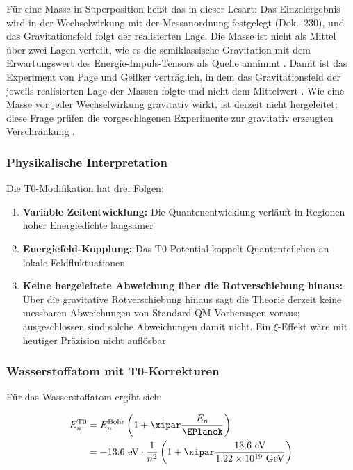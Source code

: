 	Für eine Masse in Superposition heißt das in dieser Lesart: Das Einzelergebnis wird in der Wechselwirkung mit der Messanordnung festgelegt (Dok.~230), und das Gravitationsfeld folgt der realisierten Lage. Die Masse ist nicht als Mittel über zwei Lagen verteilt, wie es die semiklassische Gravitation mit dem Erwartungswert des Energie-Impuls-Tensors als Quelle annimmt \cite{Moller1962,Rosenfeld1963}. Damit ist das Experiment von Page und Geilker verträglich, in dem das Gravitationsfeld der jeweils realisierten Lage der Massen folgte und nicht dem Mittelwert \cite{PageGeilker1981}. Wie eine Masse vor jeder Wechselwirkung gravitativ wirkt, ist derzeit nicht hergeleitet; diese Frage prüfen die vorgeschlagenen Experimente zur gravitativ erzeugten Verschränkung \cite{Bose2017,MarlettoVedral2017}.
	
	\subsubsection{Physikalische Interpretation}
	
	Die T0-Modifikation hat drei Folgen:
	
	\begin{enumerate}
		\item \textbf{Variable Zeitentwicklung:} Die Quantenentwicklung verläuft in Regionen hoher Energiedichte langsamer
		\item \textbf{Energiefeld-Kopplung:} Das T0-Potential koppelt Quantenteilchen an lokale Feldfluktuationen
		\item \textbf{Keine hergeleitete Abweichung über die Rotverschiebung hinaus:} Über die gravitative Rotverschiebung hinaus sagt die Theorie derzeit keine messbaren Abweichungen von Standard-QM-Vorhersagen voraus; ausgeschlossen sind solche Abweichungen damit nicht. Ein $\xi$-Effekt wäre mit heutiger Präzision nicht auflösbar
	\end{enumerate}
	
	\subsubsection{Wasserstoffatom mit T0-Korrekturen}
	
	Für das Wasserstoffatom ergibt sich:
	
	\begin{align}
		E_n^{\text{T0}} &= E_n^{\text{Bohr}} \left(1 + \xipar \frac{E_n}{\EPlanck}\right) \\
		&= -13.6 \text{ eV} \cdot \frac{1}{n^2} \left(1 + \xipar \frac{13.6 \text{ eV}}{1.22 \times 10^{19} \text{ GeV}}\right)
	\end{align}
	
